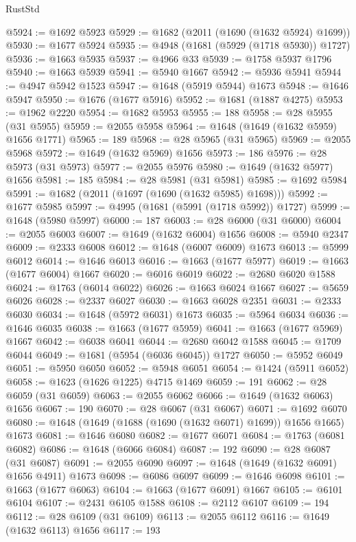 \begin{lexlean}{RustStd}
\begin{coremodule}
@5924 := @1692 @5923
@5929 := @1682 (@2011 (@1690 (@1632 @5924) @1699))
@5930 := @1677 @5924
@5935 := @4948 (@1681 (@5929 (@1718 @5930)) @1727)
@5936 := @1663 @5935
@5937 := @4966 @33
@5939 := @1758 @5937 @1796
@5940 := @1663 @5939
@5941 := @5940 @1667
@5942 := @5936 @5941
@5944 := @4947 @5942 @1523
@5947 := @1648 (@5919 @5944) @1673
@5948 := @1646 @5947
@5950 := @1676 (@1677 @5916)
@5952 := @1681 (@1887 @4275)
@5953 := @1962 @2220
@5954 := @1682 @5953
@5955 := 188
@5958 := @28 @5955 (@31 @5955)
@5959 := @2055 @5958
@5964 := @1648 (@1649 (@1632 @5959) @1656 @1771)
@5965 := 189
@5968 := @28 @5965 (@31 @5965)
@5969 := @2055 @5968
@5972 := @1649 (@1632 @5969) @1656
@5973 := 186
@5976 := @28 @5973 (@31 @5973)
@5977 := @2055 @5976
@5980 := @1649 (@1632 @5977) @1656
@5981 := 185
@5984 := @28 @5981 (@31 @5981)
@5985 := @1692 @5984
@5991 := @1682 (@2011 (@1697 (@1690 (@1632 @5985) @1698)))
@5992 := @1677 @5985
@5997 := @4995 (@1681 (@5991 (@1718 @5992)) @1727)
@5999 := @1648 (@5980 @5997)
@6000 := 187
@6003 := @28 @6000 (@31 @6000)
@6004 := @2055 @6003
@6007 := @1649 (@1632 @6004) @1656
@6008 := @5940 @2347
@6009 := @2333 @6008
@6012 := @1648 (@6007 @6009) @1673
@6013 := @5999 @6012
@6014 := @1646 @6013
@6016 := @1663 (@1677 @5977)
@6019 := @1663 (@1677 @6004) @1667
@6020 := @6016 @6019
@6022 := @2680 @6020 @1588
@6024 := @1763 (@6014 @6022)
@6026 := @1663 @6024 @1667
@6027 := @5659 @6026
@6028 := @2337 @6027
@6030 := @1663 @6028 @2351
@6031 := @2333 @6030
@6034 := @1648 (@5972 @6031) @1673
@6035 := @5964 @6034
@6036 := @1646 @6035
@6038 := @1663 (@1677 @5959)
@6041 := @1663 (@1677 @5969) @1667
@6042 := @6038 @6041
@6044 := @2680 @6042 @1588
@6045 := @1709 @6044
@6049 := @1681 (@5954 (@6036 @6045)) @1727
@6050 := @5952 @6049
@6051 := @5950 @6050
@6052 := @5948 @6051
@6054 := @1424 (@5911 @6052)
@6058 := @1623 (@1626 @1225) @4715 @1469
@6059 := 191
@6062 := @28 @6059 (@31 @6059)
@6063 := @2055 @6062
@6066 := @1649 (@1632 @6063) @1656
@6067 := 190
@6070 := @28 @6067 (@31 @6067)
@6071 := @1692 @6070
@6080 := @1648 (@1649 (@1688 (@1690 (@1632 @6071) @1699)) @1656 @1665) @1673
@6081 := @1646 @6080
@6082 := @1677 @6071
@6084 := @1763 (@6081 @6082)
@6086 := @1648 (@6066 @6084)
@6087 := 192
@6090 := @28 @6087 (@31 @6087)
@6091 := @2055 @6090
@6097 := @1648 (@1649 (@1632 @6091) @1656 @4911) @1673
@6098 := @6086 @6097
@6099 := @1646 @6098
@6101 := @1663 (@1677 @6063)
@6104 := @1663 (@1677 @6091) @1667
@6105 := @6101 @6104
@6107 := @2431 @6105 @1588
@6108 := @2112 @6107
@6109 := 194
@6112 := @28 @6109 (@31 @6109)
@6113 := @2055 @6112
@6116 := @1649 (@1632 @6113) @1656
@6117 := 193

\end{coremodule}
\end{lexlean}
